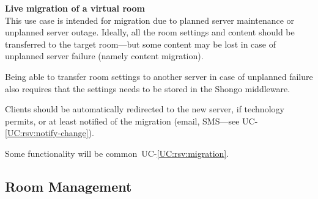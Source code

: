 \documentclass[a4paper]{report}
\makeatletter
\newcounter{UCcounter}
\newenvironment{UseCases}%
	{\begin{list}{UC-\arabic{UCcounter}}{\@nmbrlisttrue\def\@listctr{UCcounter}}}%
	{\end{list}}
\newcommand{\UClabel}[1]{\label{UC:#1}}
\newcommand{\UCref}[1]{UC-\ref{UC:#1}}
\newcommand{\UseCase}[2]{\item\UClabel{#2} \textbf{#1}\\}
\makeatother
\begin{document}
\begin{UseCases}

\UseCase{Live migration of a virtual room}{ops:migration}

This use case is intended for migration due to planned server maintenance or
unplanned server outage.  Ideally, all the room settings and content should be
transferred to the target room---but some content may be lost in case of
unplanned server failure (namely content migration).

Being able to transfer room settings to another server in case of unplanned
failure also requires that the settings needs to be stored in the Shongo
middleware.

Clients should be automatically redirected to the new server, if technology
permits, or at least notified of the migration (email, SMS---see
\UCref{rsv:notify-change}).

Some functionality will be common~\UCref{rsv:migration}.

\end{UseCases}

\subsection{Room Management}
\end{document}
